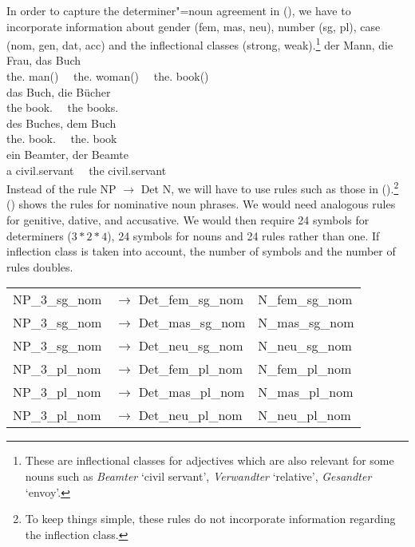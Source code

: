 In order to capture the determiner"=noun agreement in (), we have to incorporate information about gender (fem, mas, neu),
number (sg, pl), case (nom, gen, dat, acc) and the inflectional classes (strong, weak).\footnote{%
These are inflectional classes for adjectives which are also relevant for some nouns such as \emph{Beamter} `civil servant', 
\emph{Verwandter} `relative', \emph{Gesandter} `envoy'.
}
\eal\settowidth{}
\ex 
\gll der Mann, die Frau, das Buch\\
     the.\mas{} man(\mas)~~ the.\fem{} woman(\fem)~~ the.\neu{} book(\neu)\\
\ex 
\gll das Buch, die Bücher\\
     the book.\SG{}~~ the books.\PL\\
\ex 
\gll des Buches, dem Buch\\
     the.\GEN{} book.\GEN{}~~ the.\DAT{} book\\
\ex{} 
\gll ein Beamter,     der Beamte\\
     a civil.servant~~ the civil.servant\\
\zl
\largerpage
Instead of the rule NP $\to$ Det N, we will have to use rules such as those in ().\footnote{%
  To keep things simple, these rules do not incorporate information regarding the inflection class.
}
() shows the rules for nominative noun phrases. We would need analogous rules for genitive,
dative, and accusative. We would then require 24 symbols for determiners ($3*2*4$), 24 symbols for nouns and
24 rules rather than one. If inflection class is taken into account, the number of symbols and the
number of rules doubles. 
\ea
\begin{tabular}[t]{@{}l@{ }l@{~~}l}
NP\_3\_sg\_nom  & $\to$ Det\_fem\_sg\_nom & N\_fem\_sg\_nom \\
NP\_3\_sg\_nom  & $\to$ Det\_mas\_sg\_nom & N\_mas\_sg\_nom \\
NP\_3\_sg\_nom  & $\to$ Det\_neu\_sg\_nom & N\_neu\_sg\_nom \\
NP\_3\_pl\_nom  & $\to$ Det\_fem\_pl\_nom & N\_fem\_pl\_nom \\
NP\_3\_pl\_nom  & $\to$ Det\_mas\_pl\_nom & N\_mas\_pl\_nom \\
NP\_3\_pl\_nom  & $\to$ Det\_neu\_pl\_nom & N\_neu\_pl\_nom \\
\end{tabular}
\z

